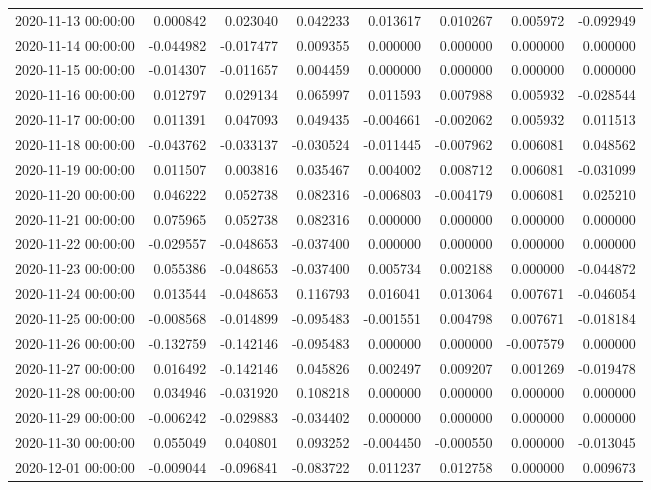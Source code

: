 \begin{tabular}{lrrrrrrr}
2020-11-13 00:00:00 & 0.000842 & 0.023040 & 0.042233 & 0.013617 & 0.010267 & 0.005972 & -0.092949 \\
2020-11-14 00:00:00 & -0.044982 & -0.017477 & 0.009355 & 0.000000 & 0.000000 & 0.000000 & 0.000000 \\
2020-11-15 00:00:00 & -0.014307 & -0.011657 & 0.004459 & 0.000000 & 0.000000 & 0.000000 & 0.000000 \\
2020-11-16 00:00:00 & 0.012797 & 0.029134 & 0.065997 & 0.011593 & 0.007988 & 0.005932 & -0.028544 \\
2020-11-17 00:00:00 & 0.011391 & 0.047093 & 0.049435 & -0.004661 & -0.002062 & 0.005932 & 0.011513 \\
2020-11-18 00:00:00 & -0.043762 & -0.033137 & -0.030524 & -0.011445 & -0.007962 & 0.006081 & 0.048562 \\
2020-11-19 00:00:00 & 0.011507 & 0.003816 & 0.035467 & 0.004002 & 0.008712 & 0.006081 & -0.031099 \\
2020-11-20 00:00:00 & 0.046222 & 0.052738 & 0.082316 & -0.006803 & -0.004179 & 0.006081 & 0.025210 \\
2020-11-21 00:00:00 & 0.075965 & 0.052738 & 0.082316 & 0.000000 & 0.000000 & 0.000000 & 0.000000 \\
2020-11-22 00:00:00 & -0.029557 & -0.048653 & -0.037400 & 0.000000 & 0.000000 & 0.000000 & 0.000000 \\
2020-11-23 00:00:00 & 0.055386 & -0.048653 & -0.037400 & 0.005734 & 0.002188 & 0.000000 & -0.044872 \\
2020-11-24 00:00:00 & 0.013544 & -0.048653 & 0.116793 & 0.016041 & 0.013064 & 0.007671 & -0.046054 \\
2020-11-25 00:00:00 & -0.008568 & -0.014899 & -0.095483 & -0.001551 & 0.004798 & 0.007671 & -0.018184 \\
2020-11-26 00:00:00 & -0.132759 & -0.142146 & -0.095483 & 0.000000 & 0.000000 & -0.007579 & 0.000000 \\
2020-11-27 00:00:00 & 0.016492 & -0.142146 & 0.045826 & 0.002497 & 0.009207 & 0.001269 & -0.019478 \\
2020-11-28 00:00:00 & 0.034946 & -0.031920 & 0.108218 & 0.000000 & 0.000000 & 0.000000 & 0.000000 \\
2020-11-29 00:00:00 & -0.006242 & -0.029883 & -0.034402 & 0.000000 & 0.000000 & 0.000000 & 0.000000 \\
2020-11-30 00:00:00 & 0.055049 & 0.040801 & 0.093252 & -0.004450 & -0.000550 & 0.000000 & -0.013045 \\
2020-12-01 00:00:00 & -0.009044 & -0.096841 & -0.083722 & 0.011237 & 0.012758 & 0.000000 & 0.009673 \\

\end{tabular}
